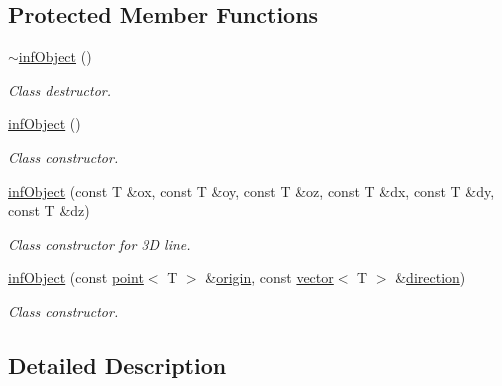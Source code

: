 \subsection*{Protected Member Functions}
\begin{DoxyCompactItemize}
\item 
\mbox{\label{classddd_1_1inf_object_ac1a0ebe2ff08ea381817fb36b7946d98}} 
\hyperlink{classddd_1_1inf_object_ac1a0ebe2ff08ea381817fb36b7946d98}{$\sim$inf\+Object} ()
\begin{DoxyCompactList}\small\item\em Class destructor. \end{DoxyCompactList}\item 
\mbox{\label{classddd_1_1inf_object_ae6f48156fbd4ff96b859f41c0f25a109}} 
\hyperlink{classddd_1_1inf_object_ae6f48156fbd4ff96b859f41c0f25a109}{inf\+Object} ()
\begin{DoxyCompactList}\small\item\em Class constructor. \end{DoxyCompactList}\item 
\mbox{\label{classddd_1_1inf_object_a699a33c377c4f582e501658f87aaae2f}} 
\hyperlink{classddd_1_1inf_object_a699a33c377c4f582e501658f87aaae2f}{inf\+Object} (const T \&ox, const T \&oy, const T \&oz, const T \&dx, const T \&dy, const T \&dz)
\begin{DoxyCompactList}\small\item\em Class constructor for 3D line. \end{DoxyCompactList}\item 
\hyperlink{classddd_1_1inf_object_aa06201c7c310e553e71dd4a45aa493fa}{inf\+Object} (const \hyperlink{classddd_1_1point}{point}$<$ T $>$ \&\hyperlink{classddd_1_1inf_object_a7238084b1c1a76b9e83b77219b985f91}{origin}, const \hyperlink{classddd_1_1vector}{vector}$<$ T $>$ \&\hyperlink{classddd_1_1inf_object_ad14315d33bb67edb17ca60306fd991a1}{direction})
\begin{DoxyCompactList}\small\item\em Class constructor. \end{DoxyCompactList}\end{DoxyCompactItemize}


\subsection{Detailed Description}
